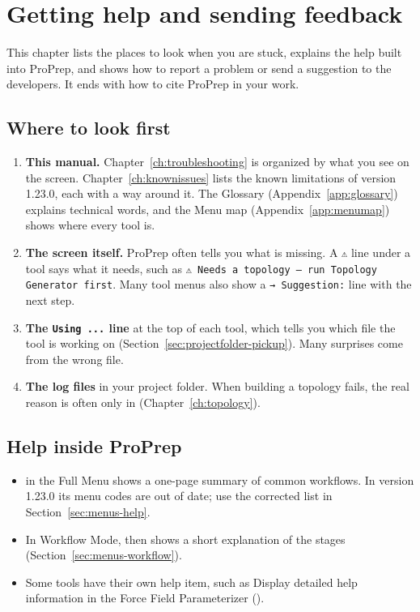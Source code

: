 \chapter{Getting help and sending feedback}\label{ch:help}

This chapter lists the places to look when you are stuck, explains the help
built into ProPrep, and shows how to report a problem or send a suggestion to
the developers. It ends with how to cite ProPrep in your work.

\section{Where to look first}\label{sec:help-first}

\begin{enumerate}
  \item \textbf{This manual.} Chapter~\ref{ch:troubleshooting} is organized by
  what you see on the screen. Chapter~\ref{ch:knownissues} lists the known
  limitations of version 1.23.0, each with a way around it. The Glossary
  (Appendix~\ref{app:glossary}) explains technical words, and the Menu map
  (Appendix~\ref{app:menumap}) shows where every tool is.
  \item \textbf{The screen itself.} ProPrep often tells you what is missing.
  A \texttt{⚠} line under a tool says what it needs, such as
  \texttt{⚠ Needs a topology — run Topology Generator first}. Many tool menus
  also show a \texttt{→ Suggestion:} line with the next step.
  \item \textbf{The \texttt{Using ...} line} at the top of each tool, which
  tells you which file the tool is working on
  (Section~\ref{sec:projectfolder-pickup}). Many surprises come from the wrong
  file.
  \item \textbf{The log files} in your project folder. When building a
  topology fails, the real reason is often only in 
  (Chapter~\ref{ch:topology}).
\end{enumerate}

\section{Help inside ProPrep}\label{sec:help-inside}

\begin{itemize}
  \item {} in the Full Menu shows a one-page summary of common workflows.
  In version 1.23.0 its menu codes are out of date; use the corrected list in
  Section~\ref{sec:menus-help}.
  \item In Workflow Mode,  then  shows a short explanation of the
  stages (Section~\ref{sec:menus-workflow}).
  \item Some tools have their own help item, such as \textsf{Display detailed
  help information} in the Force Field Parameterizer ().
\end{itemize}

